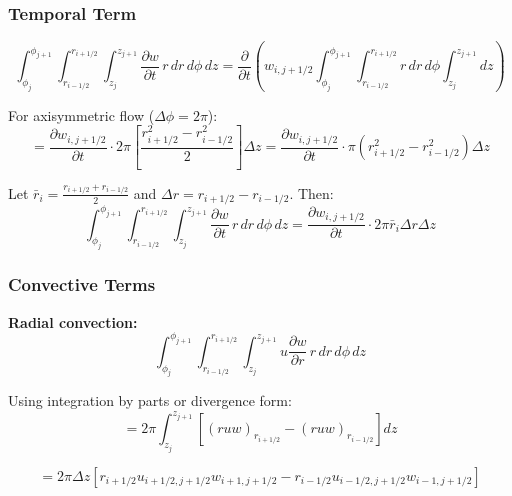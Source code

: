 \subsubsection{Temporal Term}

\begin{equation}
    \int_{\phi_j}^{\phi_{j+1}} \int_{r_{i-1/2}}^{r_{i+1/2}} \int_{z_{j}}^{z_{j+1}} \frac{\partial w}{\partial t} \, r\,dr\,d\phi\,dz = \frac{\partial}{\partial t}\left(w_{i,j+1/2} \int_{\phi_j}^{\phi_{j+1}} \int_{r_{i-1/2}}^{r_{i+1/2}} r\,dr\,d\phi \int_{z_{j}}^{z_{j+1}} dz\right)
\end{equation}

For axisymmetric flow ($\Delta\phi = 2\pi$):
\begin{equation}
    = \frac{\partial w_{i,j+1/2}}{\partial t} \cdot 2\pi \left[\frac{r_{i+1/2}^2 - r_{i-1/2}^2}{2}\right] \Delta z = \frac{\partial w_{i,j+1/2}}{\partial t} \cdot \pi(r_{i+1/2}^2 - r_{i-1/2}^2) \Delta z
\end{equation}

Let $\bar{r}_i = \frac{r_{i+1/2} + r_{i-1/2}}{2}$ and $\Delta r = r_{i+1/2} - r_{i-1/2}$. Then:
\begin{equation}
    \boxed{\int_{\phi_j}^{\phi_{j+1}} \int_{r_{i-1/2}}^{r_{i+1/2}} \int_{z_{j}}^{z_{j+1}} \frac{\partial w}{\partial t} \, r\,dr\,d\phi\,dz = \frac{\partial w_{i,j+1/2}}{\partial t} \cdot 2\pi \bar{r}_i \Delta r \Delta z}
\end{equation}

\subsubsection{Convective Terms}

\textbf{Radial convection:}
\begin{equation}
    \int_{\phi_j}^{\phi_{j+1}} \int_{r_{i-1/2}}^{r_{i+1/2}} \int_{z_{j}}^{z_{j+1}} u\frac{\partial w}{\partial r} \, r\,dr\,d\phi\,dz
\end{equation}

Using integration by parts or divergence form:
\begin{equation}
    = 2\pi \int_{z_{j}}^{z_{j+1}} \left[(ruw)_{r_{i+1/2}} - (ruw)_{r_{i-1/2}}\right] dz
\end{equation}

\begin{equation}
    \boxed{= 2\pi \Delta z \left[r_{i+1/2} u_{i+1/2,j+1/2} w_{i+1,j+1/2} - r_{i-1/2} u_{i-1/2,j+1/2} w_{i-1,j+1/2}\right]}
\end{equation}

